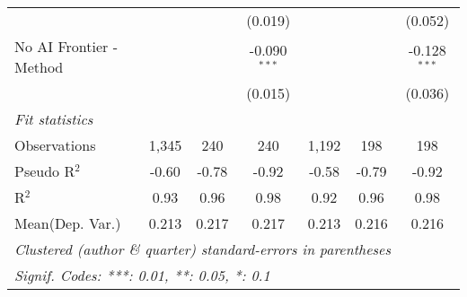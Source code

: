 \begin{tabular}{lcccccc}
                           &                &               & (0.019)        &                &         & (0.052)\\   
   No AI Frontier - Method &                &               & -0.090$^{***}$ &                &         & -0.128$^{***}$\\   
                           &                &               & (0.015)        &                &         & (0.036)\\   
   \midrule
   \emph{Fit statistics}\\
   Observations            & 1,345          & 240           & 240            & 1,192          & 198     & 198\\  
   Pseudo R$^2$            & -0.60          & -0.78         & -0.92          & -0.58          & -0.79   & -0.92\\  
   R$^2$                   & 0.93           & 0.96          & 0.98           & 0.92           & 0.96    & 0.98\\  
Mean(Dep. Var.) & 0.213 & 0.217 & 0.217 & 0.213 & 0.216 & 0.216 \\
   \midrule \midrule
   \multicolumn{7}{l}{\emph{Clustered (author \& quarter) standard-errors in parentheses}}\\
   \multicolumn{7}{l}{\emph{Signif. Codes: ***: 0.01, **: 0.05, *: 0.1}}\\
\end{tabular}
\par\endgroup
